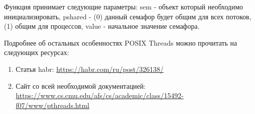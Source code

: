 Функция  принимает следующие параметры: sem - объект который необходимо инициализировать, pshared - (0) данный семафор будет общим для всех потоков, (1) общим для процессов, value - начальное значение семафора.


Подробнее об остальных особенностях POSIX Threads можно прочитать на следующих ресурсах:

\begin{enumerate}
    \item Статья habr: \url{https://habr.com/ru/post/326138/}
    \item Сайт со всей необходимой документацией: \url{https://www.cs.cmu.edu/afs/cs/academic/class/15492-f07/www/pthreads.html}
\end{enumerate}
